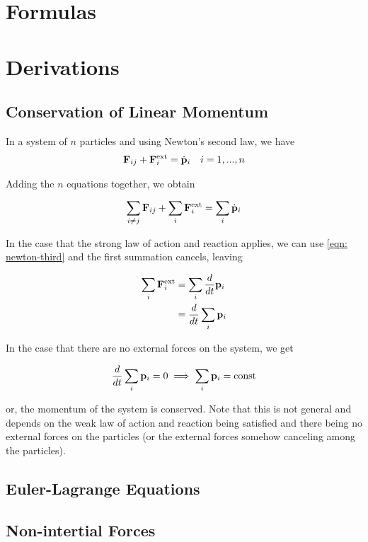 \documentclass[main.tex]{subfiles}
\begin{document}
\begin{appendices}
\chapter{Formulas}

\chapter{Derivations}

\section{Conservation of Linear Momentum}
In a system of $n$ particles and using Newton's second law, we have
\begin{align*}
\vec{F}_{ij} + \vec{F}_i^{\rm{ext}} = \dot{\vec{p}}_i && i = 1, ..., n
\end{align*}

Adding the $n$ equations together, we obtain

\begin{equation*}
\sum_{i \neq j} \vec{F}_{ij} + \sum_i \vec{F}_i^{\rm{ext}} = \sum_i \dot{\vec{p}}_i
\end{equation*}

In the case that the strong law of action and reaction applies, we can use
\cref{eqn: newton-third} and the first summation cancels, leaving

\begin{align*}
\sum_i \vec{F}^{\rm{ext}}_i &= \sum_i \frac{d}{dt} \vec{p}_i \\
&= \frac{d}{dt} \sum_i \vec{p}_i
\end{align*}

In the case that there are no external forces on the system, we get

$$
\frac{d}{dt} \sum_i \vec{p}_i = 0 \implies \sum_i \vec{p}_i = \rm{const}
$$

or, the momentum of the system is conserved. Note that this is not general and depends
on the weak law of action and reaction being satisfied and there being no external forces
on the particles (or the external forces somehow canceling among the particles).

\section{Euler-Lagrange Equations}

\section{Non-intertial Forces}


\end{appendices}
\end{document}
